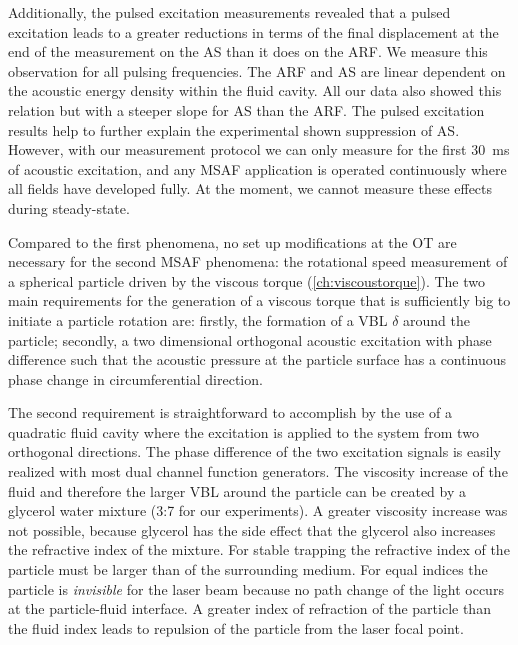 Additionally, the pulsed excitation measurements revealed that a pulsed 
excitation leads to a greater reductions in terms of the final displacement at 
the end of the measurement on the AS than it does on the ARF. We measure this 
observation for all pulsing frequencies. The ARF and AS are linear dependent on 
the acoustic energy density within the fluid cavity. All our data also showed 
this relation but with a steeper slope for AS than the ARF. The pulsed 
excitation results help to further explain the experimental shown suppression 
of AS. However, with our measurement protocol we can only measure for the first 
\SI{30}{\ms} of acoustic excitation, and any MSAF application is operated 
continuously where all fields have developed fully. At the moment, we cannot 
measure these effects during steady-state.


Compared to the first phenomena, no set up modifications at the OT are 
necessary for the second MSAF phenomena: the rotational speed measurement of a 
spherical particle driven by the viscous torque (\cref{ch:viscoustorque}). The 
two main requirements for the generation of a viscous torque that is 
sufficiently big to initiate a particle rotation are: firstly, the formation of 
a VBL $\delta$ around the particle; secondly, a two 
dimensional orthogonal acoustic excitation with phase difference such that the 
acoustic pressure at the particle surface has a continuous phase change in 
circumferential direction.

The second requirement is straightforward to accomplish by the use of a 
quadratic fluid cavity where the excitation is applied to the system from two 
orthogonal directions. The phase difference of the two excitation signals is 
easily realized with most dual channel function generators. The viscosity 
increase of the fluid and therefore the larger VBL around 
the particle can be created by a glycerol water mixture (3:7 for our 
experiments). A greater viscosity increase was not possible, because glycerol 
has the side effect that the glycerol also increases the refractive index of 
the mixture.  For stable trapping the refractive index of the particle must be 
larger than of the surrounding medium. For equal indices the particle is 
\emph{invisible} for the laser beam because no path change of the light occurs 
at the particle-fluid interface. A greater index of refraction of the particle 
than the fluid index leads to repulsion of the particle from the laser focal 
point.

